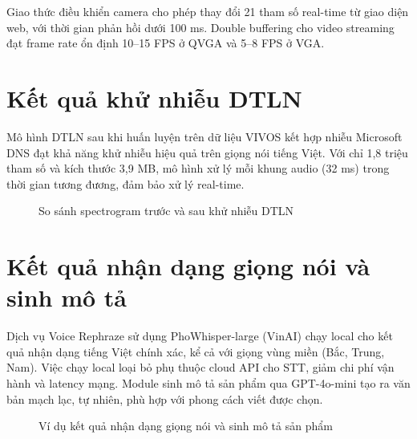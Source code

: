 Giao thức điều khiển camera cho phép thay đổi 21 tham số real-time từ giao
diện web, với thời gian phản hồi dưới 100 ms. Double buffering cho video
streaming đạt frame rate ổn định 10--15 FPS ở QVGA và 5--8 FPS ở VGA.

\section{Kết quả khử nhiễu DTLN}

Mô hình DTLN sau khi huấn luyện trên dữ liệu VIVOS kết hợp nhiễu Microsoft DNS
đạt khả năng khử nhiễu hiệu quả trên giọng nói tiếng Việt. Với chỉ 1,8 triệu
tham số và kích thước 3,9 MB, mô hình xử lý mỗi khung audio (32 ms) trong
thời gian tương đương, đảm bảo xử lý real-time.

\begin{figure}[htbp]
\centering
{}
\caption{So sánh spectrogram trước và sau khử nhiễu DTLN}
\label{fig:spectrogram-comparison}
\end{figure}

\section{Kết quả nhận dạng giọng nói và sinh mô tả}

Dịch vụ Voice Rephraze sử dụng PhoWhisper-large (VinAI) chạy local cho kết quả
nhận dạng tiếng Việt chính xác, kể cả với giọng vùng miền (Bắc, Trung, Nam).
Việc chạy local loại bỏ phụ thuộc cloud API cho STT, giảm chi phí vận hành
và latency mạng. Module sinh mô
tả sản phẩm qua GPT-4o-mini tạo ra văn bản mạch lạc, tự nhiên, phù hợp với
phong cách viết được chọn.

\begin{figure}[htbp]
\centering
{}
\caption{Ví dụ kết quả nhận dạng giọng nói và sinh mô tả sản phẩm}
\label{fig:stt-gen-example}
\end{figure}

